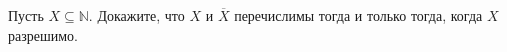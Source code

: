 Пусть $X \subseteq \mathbb{N}$. Докажите, что $X$ и $\overline{X}$ перечислимы тогда и только тогда, когда $X$ разрешимо.